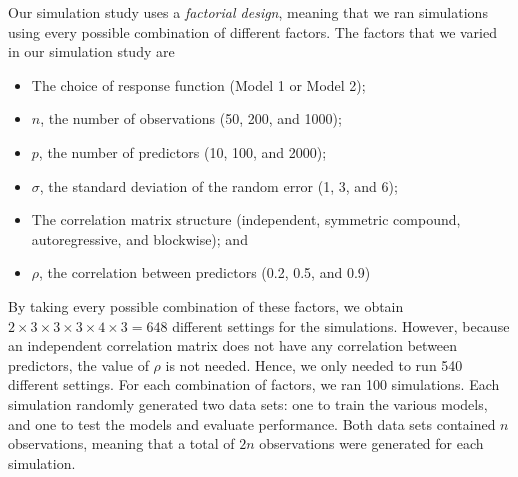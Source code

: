 \documentclass{article}
\begin{document}

	
	Our simulation study uses a \textit{factorial design}, meaning that we ran simulations using every possible combination of different factors. The factors that we varied in our simulation study are
	\begin{itemize}\itemsep0pt
		\item The choice of response function (Model 1 or Model 2);
		\item $n$, the number of observations (50, 200, and 1000);
		\item $p$, the number of predictors (10, 100, and 2000);
		\item $\sigma$, the standard deviation of the random error (1, 3, and 6);
		\item The correlation matrix structure (independent, symmetric compound, autoregressive, and blockwise); and
		\item $\rho$, the correlation between predictors (0.2, 0.5, and 0.9)
	\end{itemize}
	
	By taking every possible combination of these factors, we obtain $2\times 3\times 3\times 3\times 4\times 3 = 648$ different settings for the simulations. However, because an independent correlation matrix does not have any correlation between predictors, the value of $\rho$ is not needed. Hence, we only needed to run 540 different settings. For each combination of factors, we ran 100 simulations. Each simulation randomly generated two data sets: one to train the various models, and one to test the models and evaluate performance. Both data sets contained $n$ observations, meaning that a total of $2n$ observations were generated for each simulation.
	
\end{document}
